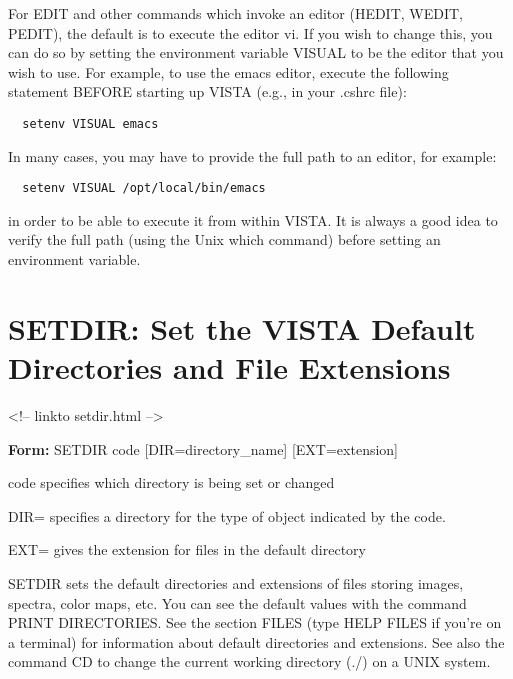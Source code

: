 For EDIT and other commands which invoke an editor (HEDIT, WEDIT, PEDIT),
the default is to execute the editor vi. If you wish to change this, you
can do so by setting the environment variable VISUAL to be the editor that
you wish to use. For example, to use the emacs editor, execute the
following statement BEFORE starting up VISTA (e.g., in your .cshrc file):
\begin{verbatim} 
  setenv VISUAL emacs
\end{verbatim}
In many cases, you may have to provide the full path to an editor, for
example:
\begin{verbatim} 
  setenv VISUAL /opt/local/bin/emacs
\end{verbatim}
in order to be able to execute it from within VISTA.  It is always a good
idea to verify the full path (using the Unix which command) before setting
an environment variable.

\section{SETDIR: Set the VISTA Default Directories and File Extensions}
\begin{rawhtml}
<!-- linkto setdir.html -->
\end{rawhtml}
\begin{command}
  \item[\textbf{Form: } SETDIR code {[DIR=directory\_name]} 
       {[EXT=extension]}\hfill]{}
  \item[code]{specifies which directory is being set or changed}
  \item[DIR= ]{   specifies a directory for the type of object
       indicated by the code.}
  \item[EXT=]{gives the extension for files in the default directory}
\end{command}

SETDIR sets the default directories and extensions of files storing images,
spectra, color maps, etc.  You can see the default values with the command
PRINT DIRECTORIES.  See the section FILES (type HELP FILES if you're on a
terminal) for information about default directories and extensions.  See
also the command CD to change the current working directory (./) on a UNIX
system.

